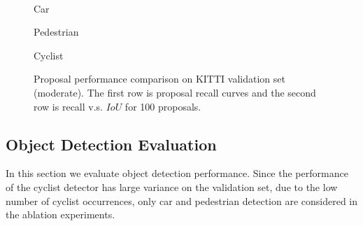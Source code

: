 \documentclass[runningheads]{llncs}
\begin{document}
\begin{figure*}[!t]
\begin{minipage}[b]{.32\linewidth}
\centering
\centerline{}
\end{minipage}
\hfill
\begin{minipage}[b]{.32\linewidth}
\centering
\centerline{}
\end{minipage}
\hfill
\begin{minipage}[b]{.32\linewidth}
\centering
\centerline{}
\end{minipage}\\
\hfill
\begin{minipage}[b]{.32\linewidth}
\centering
\centerline{}{Car}
\end{minipage}
\hfill
\begin{minipage}[b]{.32\linewidth}
\centering
\centerline{}{Pedestrian}
\end{minipage}
\hfill
\begin{minipage}[b]{.32\linewidth}
\centering
\centerline{}{Cyclist}
\end{minipage}
\caption{Proposal performance comparison on KITTI validation set (moderate). The first row is proposal recall curves and the second row is recall v.s. $IoU$ for 100 proposals.}
\label{fig:kitti proposal}
\end{figure*}





\subsection{Object Detection Evaluation}

In this section we evaluate object detection performance.
Since the performance of the cyclist detector has large variance on the
validation set, due to the low number of cyclist occurrences,
only car and pedestrian detection are considered in the ablation experiments.
\end{document}
